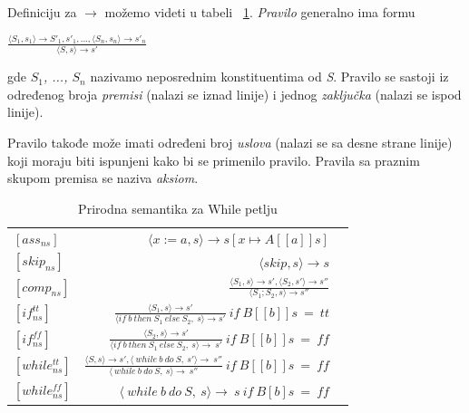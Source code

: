 \documentclass[a4paper]{article}
\begin{document}
{Definiciju za  $\rightarrow$ možemo videti u tabeli ~\ref{tab:b}. \textit{Pravilo} generalno ima formu

\begin{center}$\frac{\langle S_1, s_1 \rangle \rightarrow S'_1, s'_1, ... , \langle S_n, s_n \rangle \rightarrow s'_n}{\langle S, s \rangle \rightarrow s'}$ \end{center}

gde \textit{$S_1$, ..., $S_n$} nazivamo neposrednim konstituentima od \textit{S}. Pravilo se sastoji iz određenog broja \textit{premisi} (nalazi se iznad linije) i jednog \textit{zaključka} (nalazi se ispod linije).

Pravilo takođe može imati određeni broj \textit{uslova} (nalazi se sa desne strane linije) koji moraju biti ispunjeni kako bi se primenilo pravilo. Pravila sa praznim skupom premisa se naziva \textit{aksiom}. \cite{wiley}

\begin{table}[h]
    \begin{center}
        \begin{tabular}{lrc}\hline
        \hline
        \hline
        $[ass_{ns}] $ & $ \langle x := a, s \rangle \rightarrow s[x \mapsto A[[a]]s]$    \\  [6pt]
        $[skip_{ns}] $ & $ \langle skip, s \rangle \rightarrow s$   \\ [6pt]
         $[comp_{ns}] $ & $ \frac{\langle S_1, s \rangle \rightarrow s', \langle S_2, s' \rangle \rightarrow s''}{\langle S_1;S_2, s \rangle \rightarrow s''}$ \\[6pt]
            $[if^{tt}_{ns}] $ & $ \frac{\langle S_1, s \rangle \rightarrow s'}{\langle if\ b\ then\ S_1\ else\ S_2,\ s \rangle \rightarrow s'}\  if\ B[[b]]s\ =\ tt $ \\ [6pt]
            $[if^{ff}_{ns}] $ & $ \frac{\langle S_2, s \rangle \rightarrow s'}{\langle if\ b\ then\ S_1\ else\ S_2,\ s \rangle \rightarrow\ s'}\  if\ B[[b]]s\ =\ ff $ \\ [6pt]
            $[while^{tt}_{ns}] $ & $ \frac{\langle S, s \rangle \rightarrow s', \langle\ while\ b\ do\ S,\ s' \rangle \rightarrow\ s''}{\langle\ while\ b\ do\ S,\ s \rangle \rightarrow\ s''}\ if\ B[[b]]s\ =\ ff $ \\ [6pt]
             $[while^{ff}_{ns}] $ & $ \langle\ while\ b\ do\ S,\ s \rangle \rightarrow\ s\ if\ B[b]s\ =\ ff$ \\ [6pt]
          \hline \hline
        \end{tabular}
        \caption{Prirodna semantika za While petlju}\label{tab:b}
    \end{center}
\end{table}

}
\end{document}

